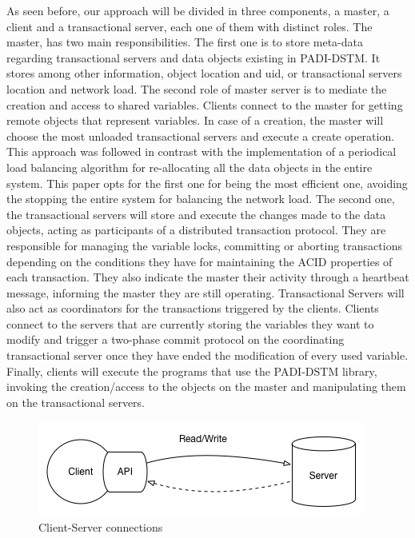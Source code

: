 \documentclass[times, 10pt,twocolumn]{article}
\begin{document}
As seen before, our approach will be divided in three components, a master, a client and a transactional server, each one of them with distinct roles.
The master, has two main responsibilities. The first one is to store meta-data regarding transactional servers and data objects existing in PADI-DSTM. It stores among other information, object location and uid, or transactional servers location and network load. The second role of master server is to mediate the creation and access to shared variables. Clients connect to the master for getting remote objects that represent variables. In case of a creation, the master will choose the most unloaded transactional servers and  execute a create operation. This approach was followed in contrast with the implementation of a periodical load balancing algorithm for re-allocating all the data objects in the entire system. This paper opts for the first one for being the most efficient one, avoiding the stopping the entire system for balancing the network load.
The second one, the transactional servers will store and execute the changes made to the data objects, acting as participants of a distributed transaction protocol. They are responsible for managing the variable locks, committing or aborting transactions depending on the conditions they have for maintaining the ACID properties of each transaction. They also indicate the master their activity through a heartbeat message, informing the master they are still operating. Transactional Servers will also act as coordinators for the transactions triggered by the clients. Clients connect to the servers that are currently storing the variables they want to modify and trigger a two-phase commit protocol on the coordinating transactional server once they have ended the modification of every used variable.  
Finally, clients will execute the programs that use the PADI-DSTM library, invoking the creation/access to the objects on the master and manipulating them on the transactional servers. 

\begin{figure}[h!]
	\centering
	\includegraphics[scale=0.45]{Client-Server.png}
	\caption{Client-Server connections}
\end{figure}
\end{document}
